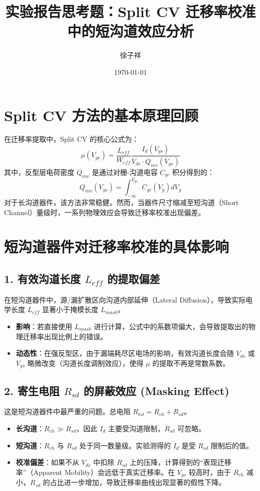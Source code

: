 \documentclass[11pt,a4paper]{article}
\begin{document}
\title{\textbf{实验报告思考题：Split CV 迁移率校准中的短沟道效应分析}}
\author{徐子祥}
\date{\today}
\maketitle

\section{Split CV 方法的基本原理回顾}

在迁移率提取中，Split CV 的核心公式为：
\begin{equation}
\mu(V_{gs}) = \frac{L_{eff}}{W_{eff}} \frac{I_d(V_{gs})}{V_{ds} \cdot Q_{inv}(V_{gs})}
\end{equation}
其中，反型层电荷密度 $Q_{inv}$ 是通过对栅-沟道电容 $C_{gc}$ 积分得到的：
\begin{equation}
Q_{inv}(V_{gs}) = \int_{-\infty}^{V_{gs}} C_{gc}(V_g) dV_g
\end{equation}
对于长沟道器件，该方法非常稳健。然而，当器件尺寸缩减至短沟道（Short Channel）量级时，一系列物理效应会导致迁移率校准出现偏差。

\section{短沟道器件对迁移率校准的具体影响}

\subsection{1. 有效沟道长度 $L_{eff}$ 的提取偏差}
在短沟道器件中，源/漏扩散区向沟道内部延伸（Lateral Diffusion），导致实际电学长度 $L_{eff}$ 显著小于掩模长度 $L_{mask}$。
\begin{itemize}
    \item \textbf{影响}：若直接使用 $L_{mask}$ 进行计算，公式中的系数项偏大，会导致提取出的物理迁移率出现比例上的错误。
    \item \textbf{动态性}：在强反型区，由于漏端耗尽区电场的影响，有效沟道长度会随 $V_{ds}$ 或 $V_{gs}$ 略微改变（沟道长度调制效应），使得 $\mu$ 的提取不再是常数系数。
\end{itemize}

\subsection{2. 寄生电阻 $R_{sd}$ 的屏蔽效应 (Masking Effect)}
这是短沟道器件中最严重的问题。总电阻 $R_{tot} = R_{ch} + R_{sd}$。
\begin{itemize}
    \item \textbf{长沟道}：$R_{ch} \gg R_{sd}$，因此 $I_d$ 主要受沟道限制，$R_{sd}$ 可忽略。
    \item \textbf{短沟道}：$R_{ch}$ 与 $R_{sd}$ 处于同一数量级。实验测得的 $I_d$ 是受 $R_{sd}$ 限制后的值。
    \item \textbf{校准偏差}：如果不从 $V_{ds}$ 中扣除 $R_{sd}$ 上的压降，计算得到的“表现迁移率”（Apparent Mobility）会远低于真实迁移率。在 $V_{gs}$ 较高时，由于 $R_{ch}$ 减小，$R_{sd}$ 的占比进一步增加，导致迁移率曲线出现显著的假性下降。
\end{itemize}
\end{document}
